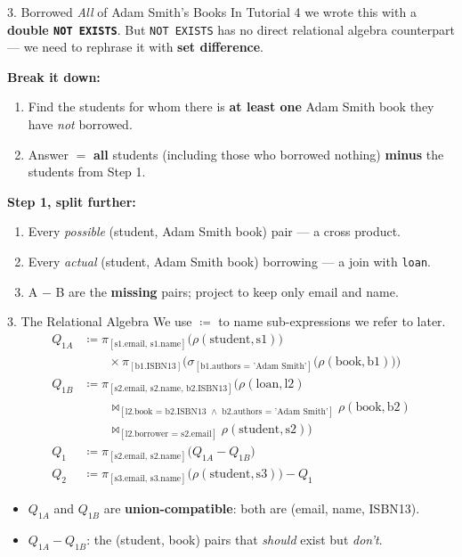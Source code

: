 \documentclass{beamer}
\newcommand\proj[1]{\pi_{[\text{#1}]}}
\newcommand\sel[1]{\sigma_{[\text{#1}]}}
\newcommand\ren[2]{\rho(\text{#1},\text{#2})}
\newcommand\njoin[1]{\bowtie_{[\text{#1}]}}
\begin{document}
\begin{frame}{3. Borrowed \emph{All} of Adam Smith's Books}
\small
In Tutorial 4 we wrote this with a \textbf{double \texttt{NOT EXISTS}}. But \texttt{NOT EXISTS} has no direct relational algebra counterpart --- we need to rephrase it with \textbf{set difference}.
\medskip

\textbf{Break it down:}
\begin{enumerate}
  \item Find the students for whom there is \textbf{at least one} Adam Smith book they have \emph{not} borrowed.
  \item Answer $=$ \textbf{all} students (including those who borrowed nothing) \textbf{minus} the students from Step 1.
\end{enumerate}
\medskip
\textbf{Step 1, split further:}
\begin{enumerate}
  \item[A.] Every \emph{possible} (student, Adam Smith book) pair --- a cross product.
  \item[B.] Every \emph{actual} (student, Adam Smith book) borrowing --- a join with \texttt{loan}.
  \item[C.] A $-$ B are the \textbf{missing} pairs; project to keep only email and name.
\end{enumerate}
\end{frame}

\begin{frame}{3. The Relational Algebra}
\scriptsize
We use $\coloneqq$ to name sub-expressions we refer to later.
\[
\begin{aligned}
Q_{1A} &\coloneqq \proj{s1.email, s1.name}\big(\ren{student}{s1}\big)\\
       &\qquad \times \proj{b1.ISBN13}\Big(\sel{b1.authors = 'Adam Smith'}\big(\ren{book}{b1}\big)\Big)\\[4pt]
Q_{1B} &\coloneqq \proj{s2.email, s2.name, b2.ISBN13}\Big(\ren{loan}{l2}\\
       &\qquad \njoin{l2.book = b2.ISBN13 $\wedge$ b2.authors = 'Adam Smith'} \ren{book}{b2}\\
       &\qquad \njoin{l2.borrower = s2.email} \ren{student}{s2}\Big)\\[4pt]
Q_{1} &\coloneqq \proj{s2.email, s2.name}\big(Q_{1A} - Q_{1B}\big)\\[4pt]
Q_{2} &\coloneqq \proj{s3.email, s3.name}\big(\ren{student}{s3}\big) - Q_1
\end{aligned}
\]
\medskip
\begin{itemize}
  \item $Q_{1A}$ and $Q_{1B}$ are \textbf{union-compatible}: both are (email, name, ISBN13).
  \item $Q_{1A} - Q_{1B}$: the (student, book) pairs that \emph{should} exist but \emph{don't}.
\end{itemize}
\end{frame}
\end{document}
